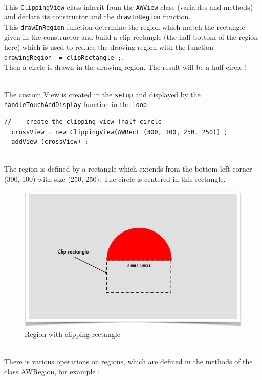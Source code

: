 \documentclass[a4paper,11pt]{extarticle}
\begin{document}
~\\ This \texttt{ClippingView} class inherit from the \texttt{AWView} class (variables and methods) and declare its constructor and the \texttt{drawInRegion} function.
~\\ This \texttt{drawInRegion} function determine the region which match the rectangle given in the constructor and build a clip rectangle (the half bottom of the region here) which is used to reduce the drawing region with the function \texttt{drawingRegion -= clipRectangle ;}.
~\\ Then a circle is drawn in the drawing region. The result will be a half circle !

~\\ The custom View is created in the \texttt{setup}  and displayed by the \texttt{handleTouchAndDisplay} function in the \texttt{loop}:
\begin{lstlisting}[language=Arduinonl]
//--- create the clipping view (half-circle
  crossView = new ClippingView(AWRect (300, 100, 250, 250)) ;
  addView (crossView) ;
\end{lstlisting}

~\\ The region is defined by a rectangle which extends from the bottom left corner (300, 100) with size (250, 250). The circle is centered in this rectangle.

\begin{figure}[htbp]
   \centering
   \includegraphics[scale=0.7]{AWFig8.png} 
   \caption{Region with clipping rectangle}
   \label{fig:8 }
\end{figure}

~\\ There is various operations on regions, which are defined in the methods of the class AWRegion, for example :
\end{document}
